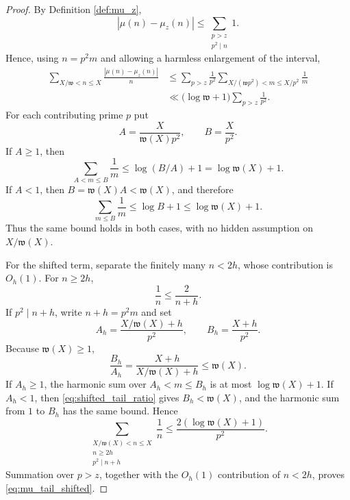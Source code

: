 \documentclass[11pt]{amsart}
\numberwithin{equation}{section}
\theoremstyle{plain}
\theoremstyle{definition}
\theoremstyle{remark}
\newcommand{\mob}{\mu}
\newcommand{\what}{\mathfrak w}
\begin{document}
\begin{proof}
By Definition \ref{def:mu_z},
\begin{equation}
|\mob(n)-\mob_z(n)|
\le\sum_{\substack{p>z\\p^2\mid n}}1.
\label{eq:mu_tail_indicator}
\end{equation}
Hence, using $n=p^2m$ and allowing a harmless enlargement of the interval,
\begin{align}
\sum_{X/\what<n\le X}\frac{|\mob(n)-\mob_z(n)|}{n}
&\le\sum_{p>z}\frac1{p^2}
\sum_{X/(\what p^2)<m\le X/p^2}\frac1m
\label{eq:mu_tail_swap}\\
&\ll\bigl(\log\what+1\bigr)\sum_{p>z}\frac1{p^2}.
\label{eq:mu_tail_harmonic}
\end{align}
For each contributing prime $p$ put
\begin{equation}
A=\frac{X}{\what(X)p^2},
\qquad
B=\frac{X}{p^2}.
\label{eq:unshifted_tail_AB}
\end{equation}
If $A\ge1$, then
\begin{equation}
\sum_{A<m\le B}\frac1m\le\log(B/A)+1=\log\what(X)+1.
\label{eq:harmonic_interval_bound}
\end{equation}
If $A<1$, then $B=\what(X)A<\what(X)$, and therefore
\begin{equation}
\sum_{m\le B}\frac1m\le\log B+1\le\log\what(X)+1.
\label{eq:harmonic_small_lower_endpoint}
\end{equation}
Thus the same bound holds in both cases, with no hidden assumption on $X/\what(X)$.

For the shifted term, separate the finitely many $n<2h$, whose contribution is $O_h(1)$.  For $n\ge2h$,
\begin{equation}
\frac1n\le\frac2{n+h}.
\label{eq:shifted_weight_comparison}
\end{equation}
If $p^2\mid n+h$, write $n+h=p^2m$ and set
\begin{equation}
A_h=\frac{X/\what(X)+h}{p^2},
\qquad
B_h=\frac{X+h}{p^2}.
\label{eq:shifted_tail_AB}
\end{equation}
Because $\what(X)\ge1$,
\begin{equation}
\frac{B_h}{A_h}=\frac{X+h}{X/\what(X)+h}\le\what(X).
\label{eq:shifted_tail_ratio}
\end{equation}
If $A_h\ge1$, the harmonic sum over $A_h<m\le B_h$ is at most $\log\what(X)+1$.  If $A_h<1$, then \eqref{eq:shifted_tail_ratio} gives $B_h<\what(X)$, and the harmonic sum from $1$ to $B_h$ has the same bound.  Hence
\begin{equation}
\sum_{\substack{X/\what(X)<n\le X\\n\ge2h\\p^2\mid n+h}}\frac1n
\le\frac{2(\log\what(X)+1)}{p^2}.
\label{eq:shifted_tail_single_prime}
\end{equation}
Summation over $p>z$, together with the $O_h(1)$ contribution of $n<2h$, proves \eqref{eq:mu_tail_shifted}.
\end{proof}
\end{document}
